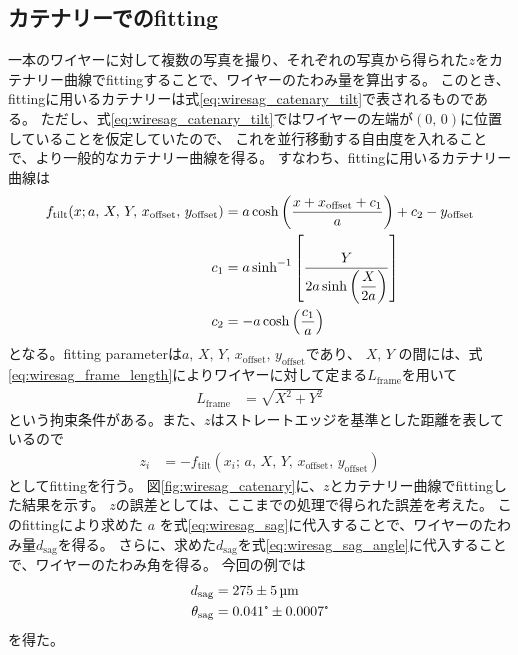\documentclass[../../main.tex]{subfiles}
\begin{document}
\subsection{カテナリーでのfitting}
一本のワイヤーに対して複数の写真を撮り、それぞれの写真から得られた$z$をカテナリー曲線でfittingすることで、ワイヤーのたわみ量を算出する。
このとき、fittingに用いるカテナリーは式\eqref{eq:wiresag_catenary_tilt}で表されるものである。
ただし、式\eqref{eq:wiresag_catenary_tilt}ではワイヤーの左端が$(0,\,0)$に位置していることを仮定していたので、
これを並行移動する自由度を入れることで、より一般的なカテナリー曲線を得る。
すなわち、fittingに用いるカテナリー曲線は
\begin{align}
    f_{\mathrm{tilt}}(x;a,\,X,\,Y,\,x_{\mathrm{offset}},\,y_{\mathrm{offset}}) &= a\cosh\qty(\dfrac{x+x_{\mathrm{offset}}+c_1}{a}) + c_2 - y_{\mathrm{offset}}\\
    c_1 &= a\sinh^{-1}\qty[\dfrac{Y}{2a\sinh\qty(\dfrac{X}{2a})}] \\
    c_2 &= -a\cosh\qty(\dfrac{c_1}{a})
\end{align}
となる。fitting parameterは$a,\,X,\,Y,\,x_{\mathrm{offset}},\,y_{\mathrm{offset}}$であり、
$X,\,Y$ の間には、式\eqref{eq:wiresag_frame_length}によりワイヤーに対して定まる$L_{\mathrm{frame}}$を用いて
\begin{align}
    L_{\mathrm{frame}} &= \sqrt{X^2+Y^2}
\end{align}
という拘束条件がある。また、$z$はストレートエッジを基準とした距離を表しているので
\begin{align}
    z_{i} &= -f_{\mathrm{tilt}}(x_{i};\,a,\,X,\,Y,\,x_{\mathrm{offset}},\,y_{\mathrm{offset}})
\end{align}
としてfittingを行う。
図\ref{fig:wiresag_catenary}に、$z$とカテナリー曲線でfittingした結果を示す。
$z$の誤差としては、ここまでの処理で得られた誤差を考えた。
このfittingにより求めた $a$ を式\eqref{eq:wiresag_sag}に代入することで、ワイヤーのたわみ量$d_{\mathrm{sag}}$を得る。
さらに、求めた$d_{\mathrm{sag}}$を式\eqref{eq:wiresag_sag_angle}に代入することで、ワイヤーのたわみ角を得る。
今回の例では
\begin{align}
    d_{\mathrm{sag}} &= 275 \pm \SI{5}{\micro m} \\
    \theta_{\mathrm{sag}} &= 0.041\tcdegree \pm 0.0007 \tcdegree
\end{align}
を得た。
\end{document}
